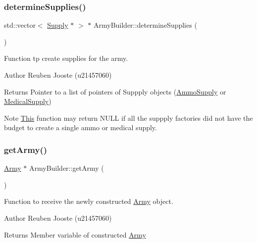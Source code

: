 \subsubsection{\texorpdfstring{determineSupplies()}{determineSupplies()}}
{\footnotesize\ttfamily std\+::vector$<$ \mbox{\hyperlink{class_supply}{Supply}} $\ast$ $>$ $\ast$ Army\+Builder\+::determine\+Supplies (\begin{DoxyParamCaption}{ }\end{DoxyParamCaption})}



Function tp create supplies for the army. 

\begin{DoxyAuthor}{Author}
Reuben Jooste (u21457060) 
\end{DoxyAuthor}
\begin{DoxyReturn}{Returns}
Pointer to a list of pointers of Suppply objects (\mbox{\hyperlink{class_ammo_supply}{Ammo\+Supply}} or \mbox{\hyperlink{class_medical_supply}{Medical\+Supply}}) 
\end{DoxyReturn}
\begin{DoxyNote}{Note}
\mbox{\hyperlink{class_this}{This}} function may return N\+U\+LL if all the suppply factories did not have the budget to create a single ammo or medical supply. 
\end{DoxyNote}
\mbox{\label{class_army_builder_a4a9b287a30f22d84cd30474edbeec24e}} 
\subsubsection{\texorpdfstring{getArmy()}{getArmy()}}
{\footnotesize\ttfamily \mbox{\hyperlink{class_army}{Army}} $\ast$ Army\+Builder\+::get\+Army (\begin{DoxyParamCaption}{ }\end{DoxyParamCaption})}



Function to receive the newly constructed \mbox{\hyperlink{class_army}{Army}} object. 

\begin{DoxyAuthor}{Author}
Reuben Jooste (u21457060) 
\end{DoxyAuthor}
\begin{DoxyReturn}{Returns}
Member variable of constructed \mbox{\hyperlink{class_army}{Army}} 
\end{DoxyReturn}
\mbox{\label{class_army_builder_a9a2e7c35c1565bd2f15f2174457f220a}} 
